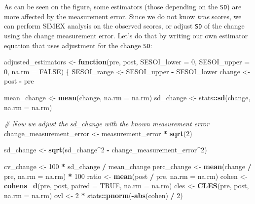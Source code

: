 \documentclass[
]{book}
\newenvironment{Shaded}{\begin{snugshade}}{\end{snugshade}}
\newcommand{\CommentTok}[1]{\textcolor[rgb]{0.56,0.35,0.01}{\textit{#1}}}
\newcommand{\ControlFlowTok}[1]{\textcolor[rgb]{0.13,0.29,0.53}{\textbf{#1}}}
\newcommand{\DataTypeTok}[1]{\textcolor[rgb]{0.13,0.29,0.53}{#1}}
\newcommand{\DecValTok}[1]{\textcolor[rgb]{0.00,0.00,0.81}{#1}}
\newcommand{\KeywordTok}[1]{\textcolor[rgb]{0.13,0.29,0.53}{\textbf{#1}}}
\newcommand{\NormalTok}[1]{#1}
\newcommand{\OperatorTok}[1]{\textcolor[rgb]{0.81,0.36,0.00}{\textbf{#1}}}
\newcommand{\OtherTok}[1]{\textcolor[rgb]{0.56,0.35,0.01}{#1}}
\newcommand{\StringTok}[1]{\textcolor[rgb]{0.31,0.60,0.02}{#1}}
\begin{document}
As can be seen on the figure, some estimators (those depending on the \texttt{SD}) are more affected by the measurement error. Since we do not know \emph{true} scores, we can perform SIMEX analysis on the observed scores, or adjust \texttt{SD} of the change using the change measurement error. Let's do that by writing our own estimator equation that uses adjustment for the change \texttt{SD}:

\begin{Shaded}
\begin{Highlighting}[]
\NormalTok{adjusted\_estimators <{-}}\StringTok{ }\ControlFlowTok{function}\NormalTok{(pre,}
\NormalTok{                                post,}
                                \DataTypeTok{SESOI\_lower =} \DecValTok{0}\NormalTok{,}
                                \DataTypeTok{SESOI\_upper =} \DecValTok{0}\NormalTok{,}
                                \DataTypeTok{na.rm =} \OtherTok{FALSE}\NormalTok{) \{}
\NormalTok{  SESOI\_range <{-}}\StringTok{ }\NormalTok{SESOI\_upper }\OperatorTok{{-}}\StringTok{ }\NormalTok{SESOI\_lower}
\NormalTok{  change <{-}}\StringTok{ }\NormalTok{post }\OperatorTok{{-}}\StringTok{ }\NormalTok{pre}

\NormalTok{  mean\_change <{-}}\StringTok{ }\KeywordTok{mean}\NormalTok{(change, }\DataTypeTok{na.rm =}\NormalTok{ na.rm)}
\NormalTok{  sd\_change <{-}}\StringTok{ }\NormalTok{stats}\OperatorTok{::}\KeywordTok{sd}\NormalTok{(change, }\DataTypeTok{na.rm =}\NormalTok{ na.rm)}

  \CommentTok{\# Now we adjust the sd\_change with the known measurement error}
\NormalTok{  change\_measurement\_error <{-}}\StringTok{ }\NormalTok{measurement\_error }\OperatorTok{*}\StringTok{ }\KeywordTok{sqrt}\NormalTok{(}\DecValTok{2}\NormalTok{)}

\NormalTok{  sd\_change <{-}}\StringTok{ }\KeywordTok{sqrt}\NormalTok{(sd\_change}\OperatorTok{\^{}}\DecValTok{2} \OperatorTok{{-}}\StringTok{ }\NormalTok{change\_measurement\_error}\OperatorTok{\^{}}\DecValTok{2}\NormalTok{)}

\NormalTok{  cv\_change <{-}}\StringTok{ }\DecValTok{100} \OperatorTok{*}\StringTok{ }\NormalTok{sd\_change }\OperatorTok{/}\StringTok{ }\NormalTok{mean\_change}
\NormalTok{  perc\_change <{-}}\StringTok{ }\KeywordTok{mean}\NormalTok{(change }\OperatorTok{/}\StringTok{ }\NormalTok{pre, }\DataTypeTok{na.rm =}\NormalTok{ na.rm) }\OperatorTok{*}\StringTok{ }\DecValTok{100}
\NormalTok{  ratio <{-}}\StringTok{ }\KeywordTok{mean}\NormalTok{(post }\OperatorTok{/}\StringTok{ }\NormalTok{pre, }\DataTypeTok{na.rm =}\NormalTok{ na.rm)}
\NormalTok{  cohen <{-}}\StringTok{ }\KeywordTok{cohens\_d}\NormalTok{(pre, post, }\DataTypeTok{paired =} \OtherTok{TRUE}\NormalTok{, }\DataTypeTok{na.rm =}\NormalTok{ na.rm)}
\NormalTok{  cles <{-}}\StringTok{ }\KeywordTok{CLES}\NormalTok{(pre, post, }\DataTypeTok{na.rm =}\NormalTok{ na.rm)}
\NormalTok{  ovl <{-}}\StringTok{ }\DecValTok{2} \OperatorTok{*}\StringTok{ }\NormalTok{stats}\OperatorTok{::}\KeywordTok{pnorm}\NormalTok{(}\OperatorTok{{-}}\KeywordTok{abs}\NormalTok{(cohen) }\OperatorTok{/}\StringTok{ }\DecValTok{2}\NormalTok{)}


\end{Highlighting}
\end{Shaded}
\end{document}
